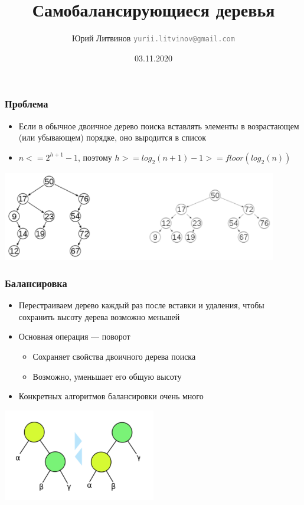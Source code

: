 \documentclass[xetex,mathserif,serif]{beamer}
\title{Самобалансирующиеся деревья}
\author[Юрий Литвинов]{Юрий Литвинов \newline \textcolor{gray}{\small\texttt{yurii.litvinov@gmail.com}}}
\date{03.11.2020}
\begin{document}
    \frame{\titlepage}

    \begin{frame}
        \frametitle{Проблема}
        \begin{itemize}
            \item Если в обычное двоичное дерево поиска вставлять элементы в возрастающем (или убывающем) порядке, оно выродится в список
            \item $n <= 2^{h + 1} - 1$, поэтому $h >= log_2(n + 1) - 1 >= floor(log_2(n))$
        \end{itemize}
        \begin{center}
            \includegraphics[width=0.9\textwidth]{tree-problem.png}
        \end{center}
    \end{frame}

    \begin{frame}
        \frametitle{Балансировка}
        \begin{itemize}
            \item Перестраиваем дерево каждый раз после вставки и удаления, чтобы сохранить высоту дерева возможно меньшей
            \item Основная операция --- поворот
            \begin{itemize}
                \item Сохраняет свойства двоичного дерева поиска
                \item Возможно, уменьшает его общую высоту
            \end{itemize}
            \item Конкретных алгоритмов балансировки очень много
        \end{itemize}
        \begin{center}
            \includegraphics[width=0.5\textwidth]{balancing.png}
        \end{center}
    \end{frame}
\end{document}
